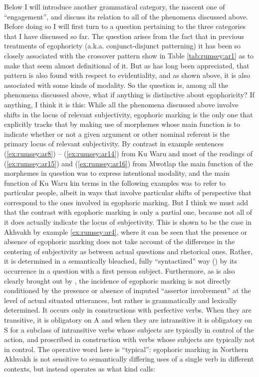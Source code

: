 \documentclass[output=paper]{langsci/langscibook}
\begin{document}
Below I will introduce another grammatical category, the nascent one of “engagement”, and discuss its relation to all of the phenomena discussed above. Before doing so I will first turn to a question pertaining to the three categories that I have discussed so far. The question arises from the fact that in previous treatments of egophoricty (a.k.a. conjunct-disjunct patterning) it has been so closely associated with the crossover pattern show in Table \ref{tab:rumsey:ar1} as to make that seem almost definitional of it. But as has long been appreciated, that pattern is also found with respect to evidentiality, and as shown above, it is also associated with some kinds of modality. So the question is, among all the phenomena discussed above, what if anything is distinctive about egophoricity?  If anything, I think it is this:  While all the phenomena discussed above involve shifts in the locus of relevant subjectivity, egophoric marking is the only one that explicitly tracks that by making use of morphemes whose main function is to indicate whether or not a given argument or other nominal referent is the primary locus of relevant subjectivity.  
By contrast in example sentences (\ref{ex:rumsey:ar8}) – (\ref{ex:rumsey:ar14}) from Ku Waru and most of the readings of (\ref{ex:rumsey:ar15}) and (\ref{ex:rumsey:ar16}) from Mwotlap the main function of the morphemes in question was to express intentional modality, and the main function of Ku Waru kin terms in the following examples was to refer to particular people, albeit in ways that involve particular shifts of perspective that correspond to the ones involved in egophoric marking. But I think we must add that the contrast with egophoric marking is only a partial one, because not all of it does actually indicate the locus of subjectivity. This is shown to be the case in Akhvakh by example \ref{ex:rumsey:ar4}, where it can be seen that the presence or absence of egophoric marking does not take account of the difference in the centering of subjectivity as between actual questions and rhetorical ones. Rather, it is determined in a semantically bleached, fully “syntactized” way (\citealt[11]{Creissels2008}) by its occurrence in a question with a first person subject. Furthermore, as is also clearly brought out by \citeauthor{Creissels2008}, the incidence of egophoric marking is not directly conditioned by the presence or absence of imputed “assertor involvement” at the level of actual situated utterances, but rather is grammatically and lexically determined.  It occurs only in constructions with perfective verbs.  When they are transitive, it is obligatory on A and when they are intransitive it is obligatory on S for a subclass of intransitive verbs whose subjects are typically in control of the action, and proscribed in construction with verbs whose subjects are typically not in control. The operative word here is “typical”:  egophoric marking in Northern Akhvakh is not sensitive to semantically differing uses of a single verb in different contexts, but instead operates as what kind \citeauthor{Creissels2008} calls:
\end{document}

